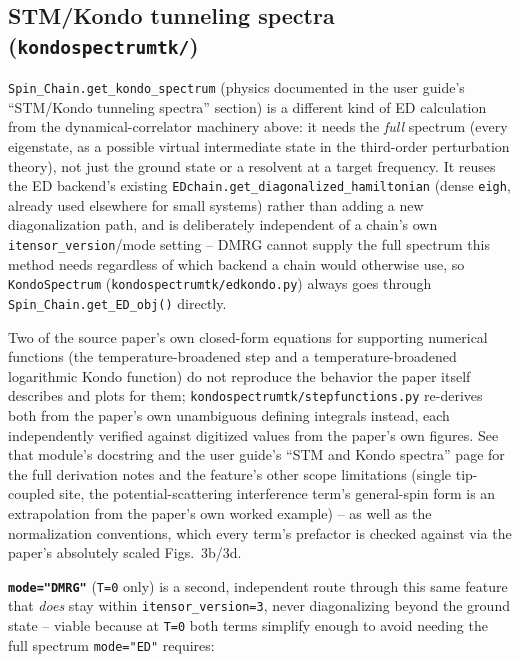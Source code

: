 \documentclass[11pt]{article}
\begin{document}
\subsection{STM/Kondo tunneling spectra (\texttt{kondospectrumtk/})}

\texttt{Spin\_Chain.get\_kondo\_spectrum} (physics documented in the user
guide's ``STM/Kondo tunneling spectra'' section) is a different kind of
ED calculation from the dynamical-correlator machinery above: it needs the
\emph{full} spectrum (every eigenstate, as a possible virtual
intermediate state in the third-order perturbation theory), not just the
ground state or a resolvent at a target frequency. It reuses the ED
backend's existing \texttt{EDchain.get\_diagonalized\_hamiltonian} (dense
\texttt{eigh}, already used elsewhere for small systems) rather than
adding a new diagonalization path, and is deliberately independent of a
chain's own \texttt{itensor\_version}/mode setting -- DMRG cannot supply
the full spectrum this method needs regardless of which backend a chain
would otherwise use, so \texttt{KondoSpectrum}
(\texttt{kondospectrumtk/edkondo.py}) always goes through
\texttt{Spin\_Chain.get\_ED\_obj()} directly.

Two of the source paper's own closed-form equations for supporting
numerical functions (the temperature-broadened step and a
temperature-broadened logarithmic Kondo function) do not reproduce the
behavior the paper itself describes and plots for them;
\texttt{kondospectrumtk/stepfunctions.py} re-derives both from the
paper's own unambiguous defining integrals instead, each independently
verified against digitized values from the paper's own figures. See
that module's docstring and the user guide's ``STM and Kondo
spectra'' page for the full derivation notes and the
feature's other scope limitations (single tip-coupled site, the
potential-scattering interference term's general-spin form is an
extrapolation from the paper's own worked example) -- as well as the
normalization conventions, which every term's prefactor is checked
against via the paper's absolutely scaled Figs.\ 3b/3d.

\textbf{\texttt{mode="DMRG"}} (\texttt{T=0} only) is a second,
independent route through this same feature that \emph{does} stay within
\texttt{itensor\_version=3}, never diagonalizing beyond the ground state
-- viable because at \texttt{T=0} both terms simplify enough to avoid
needing the full spectrum \texttt{mode="ED"} requires:
\end{document}
